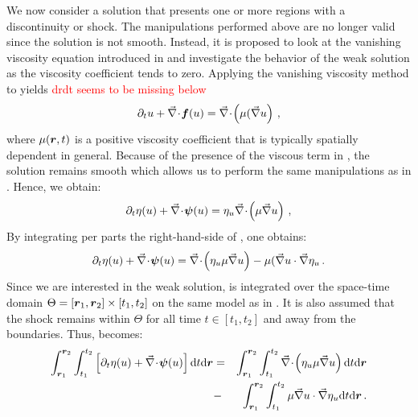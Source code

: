 We now consider a solution that presents one or more regions with a discontinuity or shock. The manipulations performed above are no longer valid since the solution is not smooth. Instead, it is proposed to look at the vanishing viscosity equation introduced in  and investigate the behavior of the weak solution as the viscosity coefficient tends to zero. Applying the vanishing viscosity method to  yields
\textcolor{red}{drdt seems to be missing below}
%
\begin{equation}\label{eq:weak_sol7_sct1b}
\partial_t u + \vec{\nabla}\! \cdot \! \boldsymbol f(u) = \vec{\nabla}\! \cdot \! \left( \mu( \vec{\nabla} u \right) \,,
\end{equation}
%
where $\mu(\boldsymbol r,t )$ is a positive viscosity coefficient that is typically spatially dependent in general. Because of the presence of the viscous term in , the solution remains smooth which allows us to perform the same manipulations as in . Hence, we obtain:
%
\begin{equation}\label{eq:weak_sol8_sct1b}
\partial_t \eta (u) + \vec{\nabla}\! \cdot \! \boldsymbol\psi (u) = \eta_u \vec{\nabla}\! \cdot \! \left( \mu \vec{\nabla} u \right) \,,
\end{equation}
%
By integrating per parts the right-hand-side of , one obtains: 
%
\begin{equation}\label{eq:weak_sol9_sct1b}
\partial_t \eta (u) + \vec{\nabla}\! \cdot \! \boldsymbol\psi (u) =  \vec{\nabla}\! \cdot \! \left( \eta_u \mu \vec{\nabla} u \right) - \mu( \vec{\nabla} u \cdot \vec{\nabla} \eta_u \,.
\end{equation}
%
Since we are interested in the weak solution,  is integrated over the space-time domain $\Theta = \left[ \boldsymbol r_1,\boldsymbol r_2 \right] \times \left[ t_1,t_2 \right]$ on the same model as in . It is also assumed that the shock remains within $\Theta$ for all time $t \in \left[ t_1, t_2 \right]$ and away from the boundaries. Thus,  becomes:
%
\begin{eqnarray}\label{eq:weak_sol10_sct1b}
\int_{\boldsymbol r_1}^{\boldsymbol r_2} \int_{t_1}^{t_2} \left[ \partial_t \eta (u) + \vec{\nabla}\! \cdot \! \boldsymbol\psi (u) \right] \text{d}t \text{d} \boldsymbol r  &=&
\int_{\boldsymbol r_1}^{\boldsymbol r_2} \int_{t_1}^{t_2}  \vec{\nabla}\! \cdot \! \left( \eta_u \mu \vec{\nabla} u \right) \text{d}t \text{d} \boldsymbol r   \nonumber \\
&-& \int_{\boldsymbol r_1}^{\boldsymbol r_2} \int_{t_1}^{t_2}  \mu \vec{\nabla} u \cdot \vec{\nabla} \eta_u \text{d}t \text{d} \boldsymbol r \,.
\end{eqnarray}
